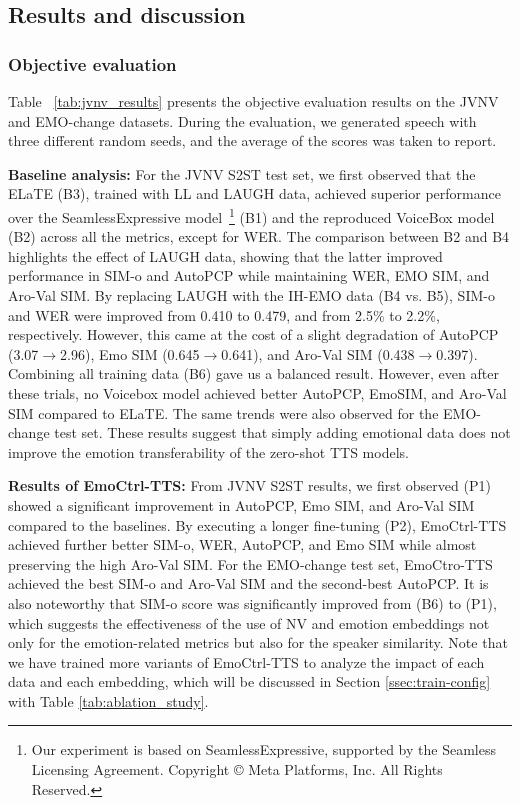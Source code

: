 
\vspace{-.5em}
\subsection{Results and discussion}
\label{sec:results}
\vspace{-.5em}

\subsubsection{Objective evaluation}
\vspace{-.5em}

Table ~\ref{tab:jvnv_results} presents the objective evaluation results on the JVNV and EMO-change datasets. During the evaluation, we generated speech
with three different random seeds, and the average of the scores was taken to report.

{\bf Baseline analysis:} 
For the JVNV S2ST test set, we first observed that the ELaTE (B3), trained with LL and LAUGH data, achieved superior performance over the SeamlessExpressive model~\cite{barrault2023seamless}\footnote{Our experiment is based on SeamlessExpressive, supported by the Seamless Licensing Agreement. Copyright © Meta Platforms, Inc. All Rights Reserved.} (B1) and the reproduced VoiceBox model (B2) across all the metrics, except for WER.
The comparison between B2 and B4  highlights the effect of LAUGH data, showing that the latter improved performance in SIM-o and AutoPCP while maintaining WER, EMO SIM, and Aro-Val SIM.
By replacing LAUGH with the IH-EMO data (B4 vs. B5), SIM-o and WER were improved from 0.410 to 0.479, and from 2.5\% to 2.2\%, respectively. However, this came at the cost of a slight degradation of AutoPCP (3.07$\rightarrow$2.96),  Emo SIM (0.645$\rightarrow$0.641), and Aro-Val SIM (0.438$\rightarrow$0.397). 
Combining all training data (B6) gave us a balanced result.
However, even after these trials, no Voicebox model achieved better AutoPCP, EmoSIM, 
and Aro-Val SIM compared to ELaTE.
The same trends were also observed for the EMO-change test set.
These results suggest that simply adding emotional data does not improve the
emotion transferability of the zero-shot TTS models.


{\bf Results of EmoCtrl-TTS:}
From JVNV S2ST results, we first observed (P1) showed a significant improvement in AutoPCP, Emo SIM, and Aro-Val SIM compared to the baselines.
By executing a longer fine-tuning (P2), EmoCtrl-TTS 
achieved further better SIM-o, WER, AutoPCP, and Emo SIM while almost preserving the high Aro-Val SIM.
For the EMO-change test set, 
EmoCtro-TTS achieved the best SIM-o and Aro-Val SIM 
and the second-best AutoPCP.
It is also noteworthy that SIM-o score was significantly improved 
from (B6) to (P1), which suggests the effectiveness of the use of NV and emotion embeddings not only for the emotion-related metrics but also for the speaker similarity.
Note that we have trained more variants of EmoCtrl-TTS to analyze the impact of
each data and each embedding, which will be discussed in Section \ref{ssec:train-config} with Table \ref{tab:ablation_study}.


